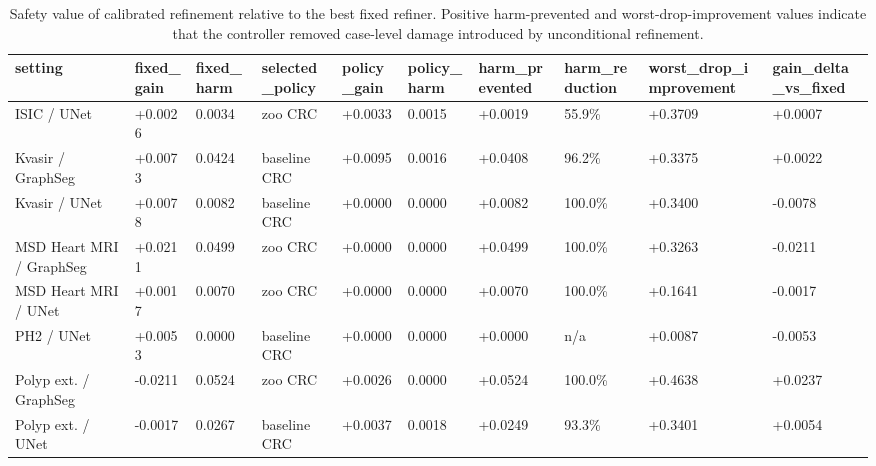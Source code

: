 \begin{table}[t]
\centering
\small
\caption{Safety value of calibrated refinement relative to the best fixed refiner. Positive harm-prevented and worst-drop-improvement values indicate that the controller removed case-level damage introduced by unconditional refinement.}
\label{tab:safety_value_over_fixed}
\begin{tabular}{llllllll}
\toprule
setting & fixed\_gain & fixed\_harm & selected\_policy & policy\_gain & policy\_harm & harm\_prevented & harm\_reduction & worst\_drop\_improvement & gain\_delta\_vs\_fixed \\
\midrule
ISIC / UNet & +0.0026 & 0.0034 & zoo CRC & +0.0033 & 0.0015 & +0.0019 & 55.9\% & +0.3709 & +0.0007 \\
Kvasir / GraphSeg & +0.0073 & 0.0424 & baseline CRC & +0.0095 & 0.0016 & +0.0408 & 96.2\% & +0.3375 & +0.0022 \\
Kvasir / UNet & +0.0078 & 0.0082 & baseline CRC & +0.0000 & 0.0000 & +0.0082 & 100.0\% & +0.3400 & -0.0078 \\
MSD Heart MRI / GraphSeg & +0.0211 & 0.0499 & zoo CRC & +0.0000 & 0.0000 & +0.0499 & 100.0\% & +0.3263 & -0.0211 \\
MSD Heart MRI / UNet & +0.0017 & 0.0070 & zoo CRC & +0.0000 & 0.0000 & +0.0070 & 100.0\% & +0.1641 & -0.0017 \\
PH2 / UNet & +0.0053 & 0.0000 & baseline CRC & +0.0000 & 0.0000 & +0.0000 & n/a & +0.0087 & -0.0053 \\
Polyp ext. / GraphSeg & -0.0211 & 0.0524 & zoo CRC & +0.0026 & 0.0000 & +0.0524 & 100.0\% & +0.4638 & +0.0237 \\
Polyp ext. / UNet & -0.0017 & 0.0267 & baseline CRC & +0.0037 & 0.0018 & +0.0249 & 93.3\% & +0.3401 & +0.0054 \\
\bottomrule
\end{tabular}
\end{table}
